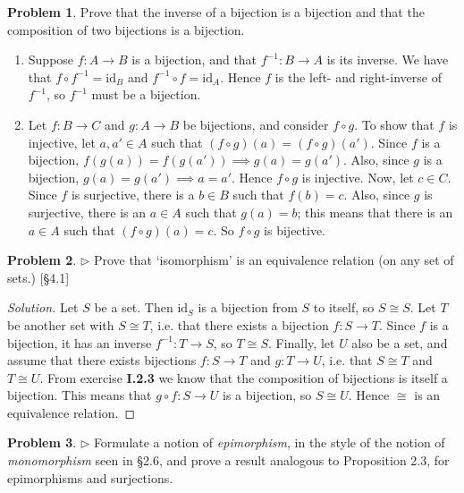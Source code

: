 \documentclass[fontsize=14pt]{scrartcl}
\theoremstyle{definition}
\newtheorem{problem-internal}{Problem}[subsection]
\newenvironment{problem}{
  \medskip
  \begin{problem-internal}
}{
  \end{problem-internal}
}
\newenvironment{solution}{
  \begin{proof}[Solution]
  \vspace{-8px}
  \setlength{\parskip}{4px}
  \setlength{\parindent}{0px}
}{
  \end{proof}
}
\newcommand{\id}{\mathrm{id}}
\begin{document}
\begin{problem}
Prove that the inverse of a bijection is a bijection and that the
composition of two bijections is a bijection.
\end{problem}

\begin{enumerate}
\item Suppose $f:A\to B$ is a bijection, and that $f^{-1}:B\to A$ is its inverse.
We have that $f\circ f^{-1} = \id_B$ and $f^{-1}\circ f = \id_A$. Hence $f$ is
the left- and right-inverse of $f^{-1}$, so $f^{-1}$ must be a bijection.

\item Let $f:B\to C$ and $g:A\to B$ be bijections, and consider $f\circ g$. To
show that $f$ is injective, let $a, a'\in A$ such that $(f\circ g)(a) = (f\circ
g)(a')$. Since $f$ is a bijection, $f(g(a)) = f(g(a')) \implies g(a) = g(a')$.
Also, since $g$ is a bijection, $g(a) = g(a') \implies a=a'$. Hence $f\circ g$
is injective. Now, let $c\in C$. Since $f$ is surjective, there is a $b\in B$
such that $f(b) = c$. Also, since $g$ is surjective, there is an $a\in A$ such
that $g(a) = b$; this means that there is an $a\in A$ such that $(f\circ g)(a) =
c$. So $f\circ g$ is bijective.
\end{enumerate}


\begin{problem}
$\rhd$ Prove that `isomorphism' is an equivalence relation (on any set
of sets.) [\S4.1]
\end{problem}

\begin{solution}
Let $S$ be a set. Then $\id_S$ is a bijection from $S$ to itself, so $S\cong S$.
Let $T$ be another set with $S\cong T$, i.e. that there exists a bijection
$f:S\to T$. Since $f$ is a bijection, it has an inverse $f^{-1}:T\to S$, so
$T\cong S$. Finally, let $U$ also be a set, and assume that there exists
bijections $f:S\to T$ and $g:T\to U$, i.e. that $S\cong T$ and $T\cong U$. From
exercise \textbf{I.2.3} we know that the composition of bijections is itself a
bijection. This means that $g\circ f: S\to U$ is a bijection, so $S\cong U$.
Hence $\cong$ is an equivalence relation.
\end{solution}


\begin{problem}
$\rhd$ Formulate a notion of \textit{epimorphism}, in the style
of the notion of \textit{monomorphism} seen in \S 2.6, and prove a result
analogous to Proposition 2.3, for epimorphisms and surjections.
\end{problem}
\end{document}
